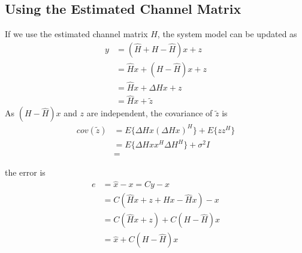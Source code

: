 \documentclass{article}
\begin{document}
\subsection{Using the Estimated Channel Matrix}
If we use the estimated channel matrix $H$, the system model can be updated as
\begin{equation}
\begin{split}
y &= (\hat{H} + H - \hat{H})x + z \\
&= \hat{H}x + (H - \hat{H})x + z \\
&= \hat{H}x + \Delta Hx + z \\
&= \hat{H}x + \tilde{z}
\end{split}
\end{equation}
As $(H - \hat{H})x$ and $z$ are independent, the covariance of $\tilde{z}$ is
\begin{equation}
\begin{split}
cov(\tilde{z}) &= E\{\Delta Hx(\Delta Hx)^H \} + E\{zz^H\} \\
&= E\{\Delta Hxx^H\Delta H^H \} + \sigma^2I \\
&= 
\end{split}
\end{equation}

the error is
\begin{equation}
\begin{split}
e &= \hat{x} - x = Cy - x \\
&= C(\hat{H}x + z + Hx - \hat{H}x) - x\\
&= C(\hat{H}x + z) + C(H - \hat{H})x \\
&= \hat{x} + C(H - \hat{H})x
\end{split}
\label{eq:uecm-1}
\end{equation}
\end{document}
